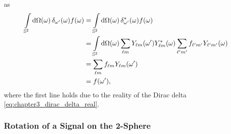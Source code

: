 %
as
%
\begin{align}
	\integrateSphere{\omega} \pixel{\delta_{\omega'}} \pixel{f}
	 & = \integrateSphere{\omega} \pixel{\conj{\delta_{\omega'}}} \pixel{f} \nonumber{}                                                                                \\
	 & = \integrateSphere{\omega} \harmonicSum \pixel[']{\harmonic{Y}} \pixel{\conj{\harmonic{Y}}} \harmonicSum['] \harmonic[']{f} \pixel{\harmonic[']{Y}} \nonumber{} \\
	 & = \harmonicSum \harmonic{f} \pixel[']{\harmonic{Y}} \nonumber{}                                                                                                 \\
	 & = \pixel[']{f},
\end{align}
%
where the first line holds due to the reality of the Dirac delta \cref{eq:chapter3_dirac_delta_real}.

\subsubsection{Rotation of a Signal on the 2-Sphere}

